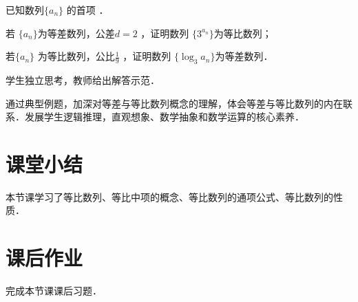 \begin{example}
     已知数列$\{a_n\}$ 的首项 ．
\begin{enumerateout}
    \item 若 $\{a_n\}$为等差数列，公差$d=2$ ，证明数列 $\{3^{a_n}\}$为等比数列；
    \item 若$\{a_n\}$ 为等比数列，公比$\frac{1}{9}$ ，证明数列 $\{  \log_{3}{a_n} \}$为等差数列．
\end{enumerateout}
\end{example}

\TSA 学生独立思考，教师给出解答示范．

\DP 通过典型例题，加深对等差与等比数列概念的理解，体会等差与等比数列的内在联系．发展学生逻辑推理，直观想象、数学抽象和数学运算的核心素养．

\section{课堂小结}
本节课学习了等比数列、等比中项的概念、等比数列的通项公式、等比数列的性质．
\section{课后作业}
\HW 完成本节课课后习题．

